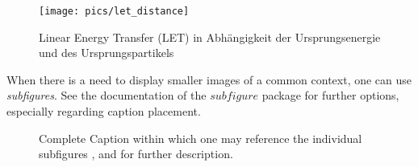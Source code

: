 \begin{figure}[htbp]
	\centering
	\texttt{[image: pics/let\_distance]}
	\caption{Linear Energy Transfer (LET) in Abhängigkeit der
          Ursprungsenergie und des Ursprungspartikels \cite{baumann2005b}}
	\label{fig:figure_example}
\end{figure}


When there is a need to display smaller images of a common context, one can use \emph{subfigures}.
See the documentation of the $subfigure$ package for further options, especially regarding caption placement.
\begin{figure}[htbp]
\centering
{}
\label{fig:subfigure_example}
\caption[Subfig Example: Abbreviated caption used in list of figures]{Complete Caption within which one may reference the individual subfigures ,  and  for further description. }
\end{figure}